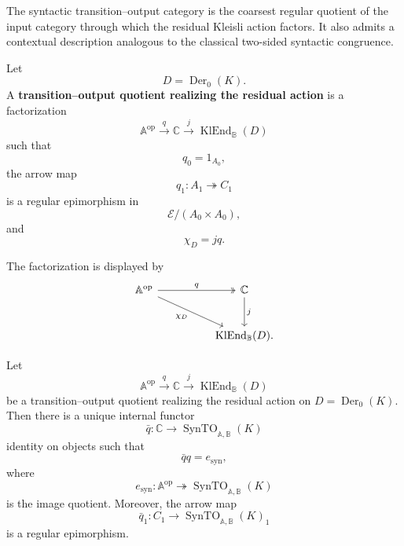 The syntactic transition--output category is the coarsest regular quotient of
the input category through which the residual Kleisli action factors. It also
admits a contextual description analogous to the classical two-sided syntactic
congruence.

\begin{definition}
\label{def:syn-to-transition-output-quotient}
    Let
    \[
        D=\operatorname{Der}_0(K).
    \]
    A \textbf{transition--output quotient realizing the residual action} is a
    factorization
    \[
        \mathbb A^{\mathrm{op}}
            \xrightarrow{q}
        \mathbb C
            \xrightarrow{j}
        \operatorname{KlEnd}_{\mathbb B}(D)
    \]
    such that
    \[
        q_0=1_{A_0},
    \]
    the arrow map
    \[
        q_1:A_1\twoheadrightarrow C_1
    \]
    is a regular epimorphism in
    \[
        \mathcal E/(A_0\times A_0),
    \]
    and
    \[
        \chi_D=jq.
    \]
\end{definition}

The factorization is displayed by
\[
\begin{tikzcd}[column sep=huge, row sep=large]
    \mathbb A^{\mathrm{op}}
        \arrow[r, "q", two heads]
        \arrow[dr, "{\chi_D}"']
    &
    \mathbb C
        \arrow[d, "j"]
    \\
    &
    \operatorname{KlEnd}_{\mathbb B}(D).
\end{tikzcd}
\]

\begin{theorem}
\label{thm:syn-to-universal-property}
    Let
    \[
        \mathbb A^{\mathrm{op}}
            \xrightarrow{q}
        \mathbb C
            \xrightarrow{j}
        \operatorname{KlEnd}_{\mathbb B}(D)
    \]
    be a transition--output quotient realizing the residual action on
    \(D=\operatorname{Der}_0(K)\). Then there is a unique internal functor
    \[
        \bar q:
        \mathbb C\to
        \operatorname{SynTO}_{\mathbb A,\mathbb B}(K)
    \]
    identity on objects such that
    \[
        \bar q q=e_{\mathrm{syn}},
    \]
    where
    \[
        e_{\mathrm{syn}}:
        \mathbb A^{\mathrm{op}}
        \twoheadrightarrow
        \operatorname{SynTO}_{\mathbb A,\mathbb B}(K)
    \]
    is the image quotient. Moreover, the arrow map
    \[
        \bar q_1:
        C_1\to
        \operatorname{SynTO}_{\mathbb A,\mathbb B}(K)_1
    \]
    is a regular epimorphism.
\end{theorem}

